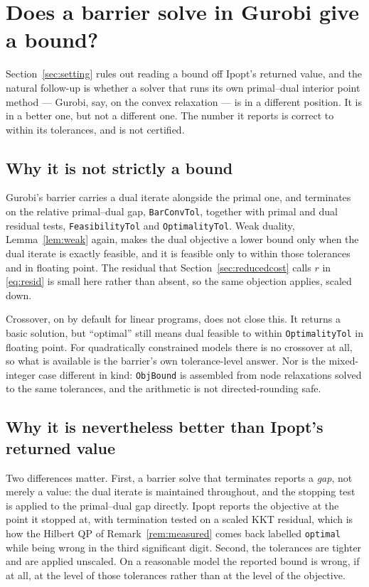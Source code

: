 \documentclass[11pt]{article}
\theoremstyle{plain}
\theoremstyle{remark}
\begin{document}
\section{Does a barrier solve in Gurobi give a bound?}\label{sec:gurobi}

Section~\ref{sec:setting} rules out reading a bound off Ipopt's returned value,
and the natural follow-up is whether a solver that runs its own primal--dual
interior point method --- Gurobi, say, on the convex relaxation --- is in a
different position.  It is in a better one, but not a different one.  The
number it reports is correct to within its tolerances, and is not certified.

\subsection{Why it is not strictly a bound}

Gurobi's barrier carries a dual iterate alongside the primal one, and
terminates on the relative primal--dual gap, \texttt{BarConvTol}, together with
primal and dual residual tests, \texttt{FeasibilityTol} and
\texttt{OptimalityTol}.  Weak duality, Lemma~\ref{lem:weak} again, makes the
dual objective a lower bound only when the dual iterate is exactly feasible,
and it is feasible only to within those tolerances and in floating point.  The
residual that Section~\ref{sec:reducedcost} calls $r$ in \eqref{eq:resid} is
small here rather than absent, so the same objection applies, scaled down.

Crossover, on by default for linear programs, does not close this.  It returns
a basic solution, but ``optimal'' still means dual feasible to within
\texttt{OptimalityTol} in floating point.  For quadratically constrained models
there is no crossover at all, so what is available is the barrier's own
tolerance-level answer.  Nor is the mixed-integer case different in kind:
\texttt{ObjBound} is assembled from node relaxations solved to the same
tolerances, and the arithmetic is not directed-rounding safe.

\subsection{Why it is nevertheless better than Ipopt's returned value}

Two differences matter.  First, a barrier solve that terminates reports a
\emph{gap}, not merely a value: the dual iterate is maintained throughout, and
the stopping test is applied to the primal--dual gap directly.  Ipopt reports
the objective at the point it stopped at, with termination tested on a scaled
KKT residual, which is how the Hilbert QP of Remark~\ref{rem:measured} comes
back labelled \texttt{optimal} while being wrong in the third significant
digit.  Second, the tolerances are tighter and are applied unscaled.  On a
reasonable model the reported bound is wrong, if at all, at the level of those
tolerances rather than at the level of the objective.
\end{document}
